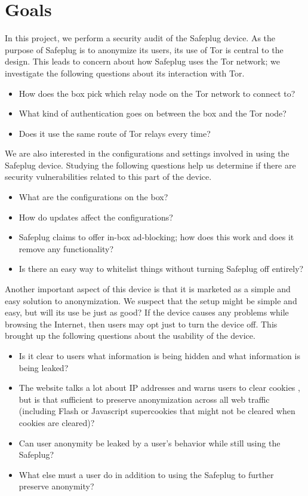 \section{Goals}
\label{sec:goals}

In this project, we perform a security audit of the Safeplug device.  As the purpose of Safeplug is to anonymize its users, its use of Tor is central to the design.  This leads to concern about how Safeplug uses the Tor network; we investigate the following questions about its interaction with Tor.  

\begin{itemize}
\item How does the box pick which relay node on the Tor network to connect to?
\item What kind of authentication goes on between the box and the Tor node?
\item Does it use the same route of Tor relays every time?
\end{itemize}

We are also interested in the configurations and settings involved in using the Safeplug device.  Studying the following questions help us determine if there are security vulnerabilities related to this part of the device.  

\begin{itemize}
\item What are the configurations on the box?
\item How do updates affect the configurations?
\item Safeplug claims to offer in-box ad-blocking; how does this work and does it remove any functionality?
\item Is there an easy way to whitelist things without turning Safeplug off entirely?
\end{itemize}

Another important aspect of this device is that it is marketed as a simple and easy solution to anonymization.  We suspect that the setup might be simple and easy, but will its use be just as good?  If the device causes any problems while browsing the Internet, then users may opt just to turn the device off.  This brought up the following questions about the usability of the device.

\begin{itemize}
\item Is it clear to users what information is being hidden and what information is being leaked?
\item The website talks a lot about IP addresses and warns users to clear cookies \cite{safeplug}, but is that sufficient to preserve anonymization across all web traffic (including Flash or Javascript supercookies that might not be cleared when cookies are cleared)?
\item Can user anonymity be leaked by a user’s behavior while still using the Safeplug?
\item What else must a user do in addition to using the Safeplug to further preserve anonymity?
\end{itemize}

